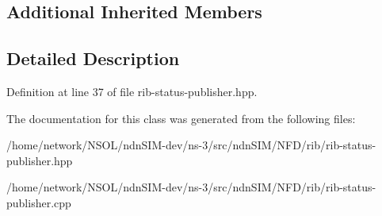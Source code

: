 \subsection*{Additional Inherited Members}


\subsection{Detailed Description}


Definition at line 37 of file rib-\/status-\/publisher.\+hpp.



The documentation for this class was generated from the following files\+:\begin{DoxyCompactItemize}
\item 
/home/network/\+N\+S\+O\+L/ndn\+S\+I\+M-\/dev/ns-\/3/src/ndn\+S\+I\+M/\+N\+F\+D/rib/rib-\/status-\/publisher.\+hpp\item 
/home/network/\+N\+S\+O\+L/ndn\+S\+I\+M-\/dev/ns-\/3/src/ndn\+S\+I\+M/\+N\+F\+D/rib/rib-\/status-\/publisher.\+cpp\end{DoxyCompactItemize}
